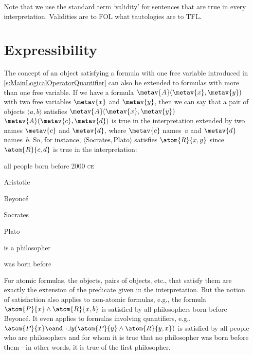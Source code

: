 Note that we use the standard term `validity' for sentences that are
true in every interpretation. Validities are to FOL what tautologies
are to TFL.

\section{Expressibility}

The concept of an object satisfying a formula with one free variable
introduced in \cref{s:MainLogicalOperatorQuantifier} can also be
extended to formulas with more than one free variable. If we have a
formula $\metav{A}(\metav{x},\metav{y})$ with two free variables
$\metav{x}$ and $\metav{y}$, then we can say that a pair of objects
$\langle a, b\rangle$ satisfies $\metav{A}(\metav{x},\metav{y})$
\ifeff{} $\metav{A}(\metav{c},\metav{d})$ is true in the
interpretation extended by two names $\metav{c}$ and $\metav{d}$,
where $\metav{c}$ names~$a$ and $\metav{d}$ names~$b$. So, for
instance, $\langle \text{Socrates}, \text{Plato}\rangle$ satisfies
$\atom{R}{x,y}$ since $\atom{R}{c,d}$ is true in the interpretation:
\begin{ekey}
	\item[\text{domain}] all people born before 2000 \textsc{ce}
	\item[a] Aristotle
	\item[b] Beyonc\'e
	\item[c] Socrates
	\item[d] Plato
	\item[\atom{P}{x}]  is a philosopher
	\item[\atom{R}{x,y}]  was born before 
\end{ekey}
For atomic formulas, the objects, pairs of objects, etc., that satisfy them are exactly the extension of the predicate given in the interpretation. But the notion of satisfaction also applies to non-atomic formulas, e.g., the formula $\atom{P}{x} \land \atom{R}{x,b}$ is satisfied by all philosophers born before Beyonc\'e. It even applies to formulas involving quantifiers, e.g., $\atom{P}{x} \eand \lnot\exists y(\atom{P}{y} \land \atom{R}{y,x})$ is satisfied by all people who are philosophers and for whom it is true that no philosopher was born before them---in other words, it is true of the first philosopher.

